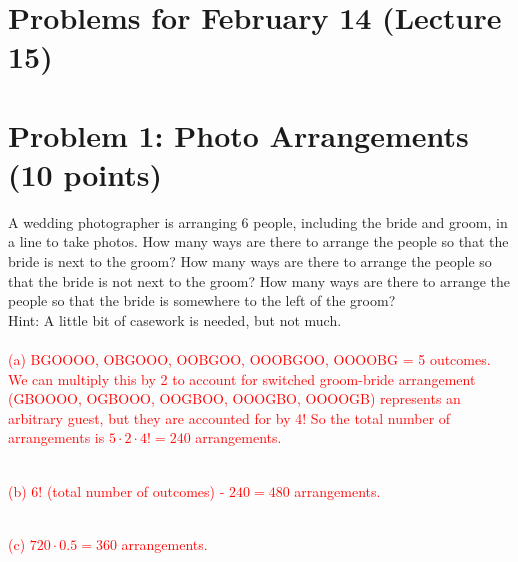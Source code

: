 \documentclass[12pt]{article}
\begin{document}
\section{Problems for February 14 (Lecture 15)}
\section*{Problem 1: Photo Arrangements (10 points)}
A wedding photographer is arranging $6$ people, including the bride and groom, in a line to take photos. How many ways are there to arrange the people so that the bride is next to the groom? How many ways are there to arrange the people so that the bride is not next to the groom? How many ways are there to arrange the people so that the bride is somewhere to the left of the groom?\\
Hint: A little bit of casework is needed, but not much. \\

\\ \textcolor{red}{(a) BGOOOO, OBGOOO, OOBGOO, OOOBGOO, OOOOBG = 5 outcomes. We can multiply this by 2 to account for switched groom-bride arrangement (GBOOOO, OGBOOO, OOGBOO, OOOGBO, OOOOGB) represents an arbitrary guest, but they are accounted for by 4! So the total number of arrangements is $5 \cdot 2 \cdot 4! = 240$ arrangements.}

\\ \textcolor{red}{(b) $6!$ (total number of outcomes) - $240 = 480$ arrangements.}

\\ \textcolor{red}{(c) $720 \cdot 0.5 = 360$ arrangements.}
\end{document}
